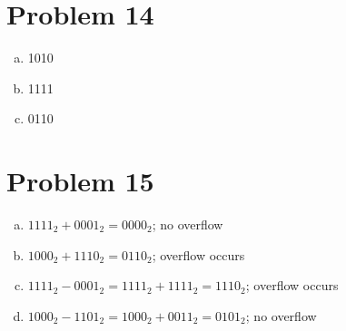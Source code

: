 \documentclass[11pt]{article}
\begin{document}
\section*{Problem 14}
\begin{enumerate}[(a)]
	\item 1010
	\item 1111
	\item 0110
\end{enumerate}

\section*{Problem 15}
\begin{enumerate}[(a)]
\item
	$1111_2+0001_2 =0000_2$; no overflow
\item
	$1000_2+1110_2 = 0110_2$; overflow occurs
\item
	$1111_2 - 0001_2 = 1111_2 + 1111_2 = 1110_2$; overflow occurs
\item
	$1000_2-1101_2 = 1000_2 + 0011_2 = 0101_2$; no overflow

\end{enumerate}
\end{document}
